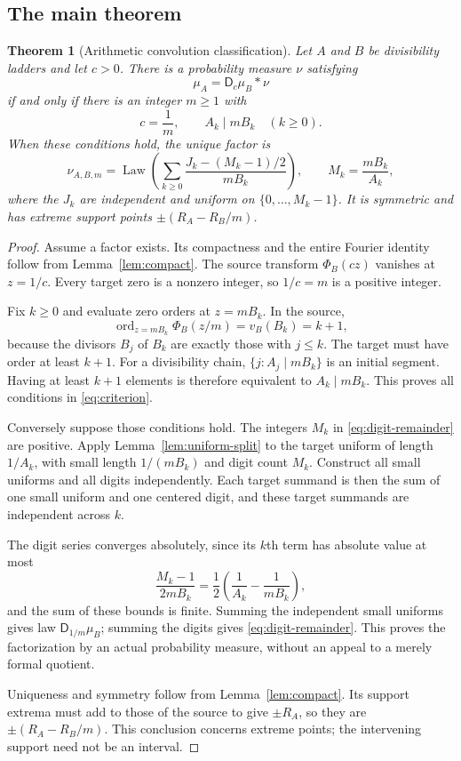 \documentclass[11pt,a4paper]{article}
\newtheorem{theorem}{Theorem}[section]
\theoremstyle{definition}
\theoremstyle{remark}
\newcommand{\Law}{\operatorname{Law}}
\newcommand{\ord}{\operatorname{ord}}
\newcommand{\D}{\mathsf D}
\begin{document}
\subsection{The main theorem}
\begin{theorem}[Arithmetic convolution classification]\label{thm:ladder}
Let $A$ and $B$ be divisibility ladders and let $c>0$. There is a probability
measure $\nu$ satisfying
\[
 \mu_A=\D_c\mu_B*\nu
\]
if and only if there is an integer $m\ge1$ with
\begin{equation}\label{eq:criterion}
 c=\frac1m,\qquad A_k\mid mB_k\quad(k\ge0).
\end{equation}
When these conditions hold, the unique factor is
\begin{equation}\label{eq:digit-remainder}
 \nu_{A,B,m}=\Law\left(
 \sum_{k\ge0}\frac{J_k-(M_k-1)/2}{mB_k}\right),\qquad
 M_k=\frac{mB_k}{A_k},
\end{equation}
where the $J_k$ are independent and uniform on
$\{0,\ldots,M_k-1\}$. It is symmetric and has extreme support points
$\pm(R_A-R_B/m)$.
\end{theorem}
\begin{proof}
Assume a factor exists. Its compactness and the entire Fourier identity
follow from Lemma~\ref{lem:compact}. The source transform
$\Phi_B(cz)$ vanishes at $z=1/c$. Every target zero is a nonzero integer,
so $1/c=m$ is a positive integer.

Fix $k\ge0$ and evaluate zero orders at $z=mB_k$. In the source,
\[
 \ord_{z=mB_k}\Phi_B(z/m)=v_B(B_k)=k+1,
\]
because the divisors $B_j$ of $B_k$ are exactly those with $j\le k$.
The target must have order at least $k+1$. For a divisibility chain,
$\{j:A_j\mid mB_k\}$ is an initial segment. Having at least $k+1$
elements is therefore equivalent to $A_k\mid mB_k$. This proves all
conditions in \eqref{eq:criterion}.

Conversely suppose those conditions hold. The integers $M_k$ in
\eqref{eq:digit-remainder} are positive. Apply
Lemma~\ref{lem:uniform-split} to the target uniform of length $1/A_k$,
with small length $1/(mB_k)$ and digit count $M_k$. Construct all small
uniforms and all digits independently. Each target summand is then the
sum of one small uniform and one centered digit, and these target summands
are independent across $k$.

The digit series converges absolutely, since its $k$th term has absolute
value at most
\[
 \frac{M_k-1}{2mB_k}
 =\frac12\left(\frac1{A_k}-\frac1{mB_k}\right),
\]
and the sum of these bounds is finite. Summing the independent small
uniforms gives law $\D_{1/m}\mu_B$; summing the digits gives
\eqref{eq:digit-remainder}. This proves the factorization by an actual
probability measure, without an appeal to a merely formal quotient.

Uniqueness and symmetry follow from Lemma~\ref{lem:compact}. Its support
extrema must add to those of the source to give $\pm R_A$, so they are
$\pm(R_A-R_B/m)$. This conclusion concerns extreme points; the intervening
support need not be an interval.
\end{proof}
\end{document}
